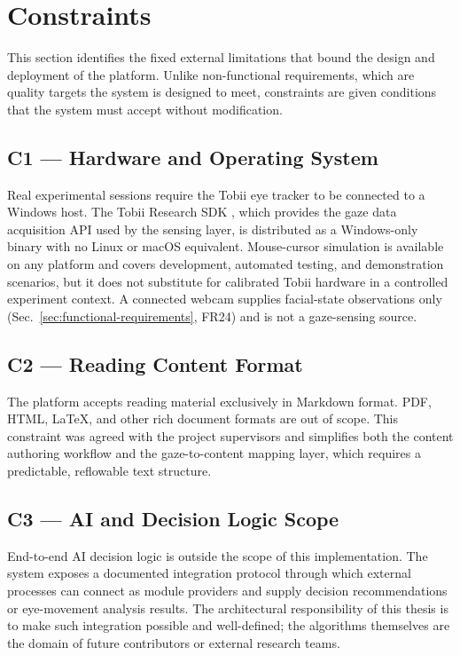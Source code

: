 \section{Constraints}
\label{sec:constraints}

This section identifies the fixed external limitations that bound the design and deployment of the platform.
Unlike non-functional requirements, which are quality targets the system is designed to meet, constraints are given conditions that the system must accept without modification.

\subsection*{C1 — Hardware and Operating System}

Real experimental sessions require the Tobii eye tracker to be connected to a Windows host.
The Tobii Research SDK \cite{tobii2025fusion}, which provides the gaze data acquisition API used by the sensing layer, is distributed as a Windows-only binary with no Linux or macOS equivalent.
Mouse-cursor simulation is available on any platform and covers development, automated testing, and demonstration scenarios, but it does not substitute for calibrated Tobii hardware in a controlled experiment context. A connected webcam supplies facial-state observations only (Sec.~\ref{sec:functional-requirements}, FR24) and is not a gaze-sensing source.

\subsection*{C2 — Reading Content Format}

The platform accepts reading material exclusively in Markdown format.
PDF, HTML, LaTeX, and other rich document formats are out of scope.
This constraint was agreed with the project supervisors and simplifies both the content authoring workflow and the gaze-to-content mapping layer, which requires a predictable, reflowable text structure.

\subsection*{C3 — AI and Decision Logic Scope}

End-to-end AI decision logic is outside the scope of this implementation.
The system exposes a documented integration protocol through which external processes can connect as module providers and supply decision recommendations or eye-movement analysis results.
The architectural responsibility of this thesis is to make such integration possible and well-defined; the algorithms themselves are the domain of future contributors or external research teams.

